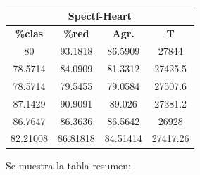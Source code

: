 \documentclass[11pt,a4paper]{article}
\theoremstyle{definition}
\begin{document}
\begin{tabbing}
{		\begin{tabular}{|c|c|c|c|}
			\hline
			\multicolumn{4}{|c|}{\textbf{Spectf-Heart}} \\ \hline
			\textbf{\%clas} & \textbf{\%red} & \textbf{Agr.} & \textbf{T} \\ \hline 
			80 & 93.1818 & 86.5909 & 27844 \\ \hline
78.5714 & 84.0909 & 81.3312 & 27425.5 \\ \hline
78.5714 & 79.5455 & 79.0584 & 27507.6 \\ \hline
87.1429 & 90.9091 & 89.026 & 27381.2 \\ \hline
86.7647 & 86.3636 & 86.5642 & 26928 \\ \hline
82.21008 & 86.81818 & 84.51414 & 27417.26 \\ \hline
		\end{tabular}
		}
	\end{tabbing}
	
	
	Se muestra la tabla resumen:
	
\end{document}

